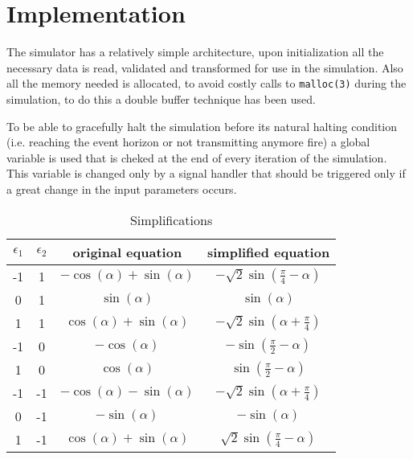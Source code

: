 \documentclass[draft]{article}
\begin{document}

\section{Implementation}\label{sec:implementation}

The simulator has a relatively simple architecture, upon initialization all the
necessary data is read, validated and transformed for use in the simulation.
Also all the memory needed is allocated, to avoid costly calls to
\texttt{malloc(3)} during the simulation, to do this a double buffer technique
has been used.


To be able to gracefully halt the simulation before its natural halting
condition (i.e. reaching the event horizon or not transmitting anymore fire) a
global variable is used that is cheked at the end of every iteration of the
simulation. This variable is changed only by a signal handler that should be
triggered only if a great change in the input parameters occurs.

\begin{table}
\centering
\begin{tabular}{c c | c | c}
$\epsilon_1$ & $\epsilon_2$ & original equation & simplified equation\\
\hline
-1 & 1 & $-\cos(\alpha)+\sin(\alpha)$ & $-\sqrt{2}\sin(\frac{\pi}{4}-\alpha)$\\
0 & 1 & $\sin(\alpha)$ & $\sin(\alpha)$\\
1 & 1 & $\cos(\alpha) + \sin(\alpha)$ & $-\sqrt{2}\sin(\alpha+\frac{\pi}{4})$\\
-1 & 0 & $-\cos(\alpha)$ & $-\sin(\frac{\pi}{2}-\alpha)$\\
1 & 0 & $\cos(\alpha)$ & $\sin(\frac{\pi}{2}-\alpha)$\\
-1 & -1 & $-\cos(\alpha)-\sin(\alpha)$ & $-\sqrt{2}\sin(\alpha+\frac{\pi}{4})$\\
0 & -1 & $-\sin(\alpha)$ & $-\sin(\alpha)$\\
1 & -1 & $\cos(\alpha) + \sin(\alpha)$ & $\sqrt{2}\sin(\frac{\pi}{4}-\alpha)$\\
\end{tabular}
\caption{Simplifications}
\label{tab:simplifications}
\end{table}
\end{document}
